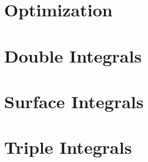 \documentclass[letterpaper,oneside]{book}%
\theoremstyle{plain}
\theoremstyle{box}
\begin{document}
\chapter{Optimization}

\chapter{Double Integrals}
\chapter{Surface Integrals}
\chapter{Triple Integrals}
\end{document}
